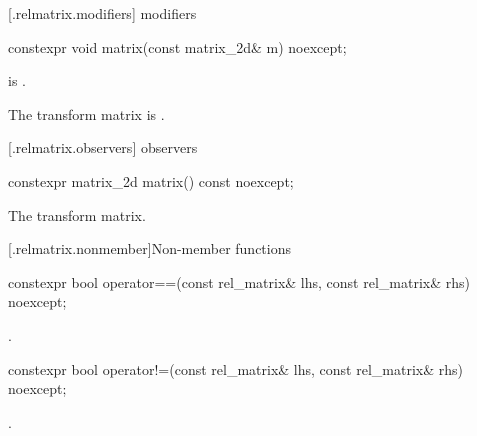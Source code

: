  [\iotwod.relmatrix.modifiers]{ modifiers}

%
\begin{itemdecl}
constexpr void matrix(const matrix_2d& m) noexcept;
\end{itemdecl}
\begin{itemdescr}
\pnum
\requires
{} is .

\pnum
\effects
The transform matrix is .
\end{itemdescr}

 [\iotwod.relmatrix.observers]{ observers}

%
\begin{itemdecl}
constexpr matrix_2d matrix() const noexcept;
\end{itemdecl}
\begin{itemdescr}
\pnum
\returns
The transform matrix.
\end{itemdescr}

 [\iotwod.relmatrix.nonmember]{Non-member functions}

%
\begin{itemdecl}
constexpr bool operator==(const rel_matrix& lhs, const rel_matrix& rhs) 
  noexcept;
\end{itemdecl}
\begin{itemdescr}
\pnum
\returns
{}.
\end{itemdescr}

%
\begin{itemdecl}
constexpr bool operator!=(const rel_matrix& lhs, const rel_matrix& rhs) 
  noexcept;
\end{itemdecl}
\begin{itemdescr}
\pnum
\returns
{}.
\end{itemdescr}
